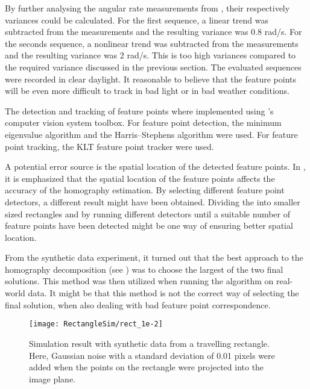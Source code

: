 By further analysing the angular rate measurements from , their respectively variances could be calculated.
For the first sequence, a linear trend was subtracted from the measurements and the resulting variance was 0.8 rad/s.
For the seconds sequence, a nonlinear trend was subtracted from the measurements and the resulting variance was 2 rad/s.
This is too high variances compared to the required variance discussed in the previous section.
The evaluated sequences were recorded in clear daylight.
It reasonable to believe that the feature points will be even more difficult to track in bad light or in bad weather conditions.

The detection and tracking of feature points where implemented using \matlab's computer vision system toolbox.
For feature point detection, the minimum eigenvalue algorithm \cite{mineigendetector:2018} and the Harris–Stephens algorithm \cite{harrisdetector:2018} were used.
For feature point tracking, the KLT feature point tracker \cite{pointtracker:2018} were used.

A potential error source is the spatial location of the detected feature points.
In \cite{Bostanci:2012}, it is emphasized that the spatial location of the feature points affects the accuracy of the homography estimation.
By selecting different feature point detectors, a different result might have been obtained.
Dividing the \abbrROI into smaller sized rectangles and by running different detectors until a suitable number of feature points have been detected might be one way of ensuring better spatial location.

From the synthetic data experiment, it turned out that the best approach to the homography decomposition (see ) was to choose the largest of the two final solutions.
This method was then utilized when running the algorithm on real-world data.
It might be that this method is not the correct way of selecting the final solution, when also dealing with bad feature point correspondence.

\clearpage

\begin{figure}[!ht]
	\centering
	\texttt{[image: RectangleSim/rect\_1e-2]}
	\caption{\label{fig:rectsim1e-2} Simulation result with synthetic data from a travelling rectangle. Here, Gaussian noise with a standard deviation of 0.01 pixels were added when the points on the rectangle were projected into the image plane.}
\end{figure}

